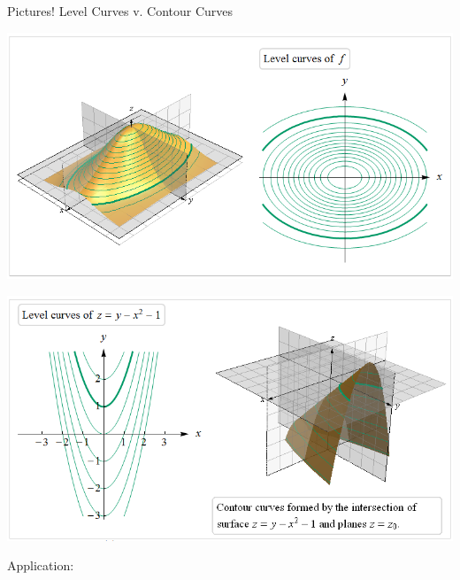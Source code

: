 \documentclass[12pt]{beamer}
\theoremstyle{plain}
\theoremstyle{definition}
\begin{document}
\begin{frame}[allowframebreaks]{\small Pictures!}{}
\framebreak
Level Curves v. Contour Curves
\begin{center}
\includegraphics[scale=0.45]{12-2levCurves}
\end{center}

\framebreak
\begin{center}
\includegraphics[scale=0.5]{12-2levCurves2}
\end{center}

\framebreak
Application: \tiny
\vspace{-0.75pc}


\end{frame}
\end{document}
